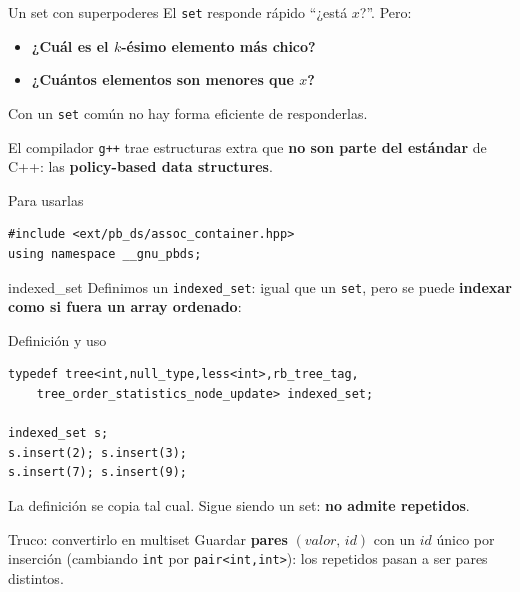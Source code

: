 \documentclass{beamer}
\begin{document}
\begin{frame}[fragile]{Un set con superpoderes}
    El \texttt{set} responde rápido ``¿está $x$?''. Pero:
    \begin{itemize}
        \item \textbf{¿Cuál es el $k$-ésimo elemento más chico?}
        \item \textbf{¿Cuántos elementos son menores que $x$?}
    \end{itemize}
    Con un \texttt{set} común no hay forma eficiente de responderlas.

    \vspace{0.2cm}
    El compilador \texttt{g++} trae estructuras extra que \textbf{no son parte
    del estándar} de C++: las \textbf{policy-based data structures}.
    \begin{block}{Para usarlas}
\begin{verbatim}
#include <ext/pb_ds/assoc_container.hpp>
using namespace __gnu_pbds;
\end{verbatim}
    \end{block}
\end{frame}


\begin{frame}[fragile]{indexed\_set}
    Definimos un \texttt{indexed\_set}: igual que un \texttt{set}, pero se
    puede \textbf{indexar como si fuera un array ordenado}:
    \begin{block}{Definición y uso}
    \footnotesize
\begin{verbatim}
typedef tree<int,null_type,less<int>,rb_tree_tag,
    tree_order_statistics_node_update> indexed_set;

indexed_set s;
s.insert(2); s.insert(3);
s.insert(7); s.insert(9);
\end{verbatim}
    \end{block}

    \vspace{0.1cm}
    La definición se copia tal cual. Sigue siendo un set:
    \textbf{no admite repetidos}.

    \begin{exampleblock}{Truco: convertirlo en multiset}
        Guardar \textbf{pares} $(valor,\, id)$ con un $id$ único por inserción
        (cambiando \texttt{int} por \texttt{pair<int,int>}): los repetidos
        pasan a ser pares distintos.
    \end{exampleblock}
\end{frame}
\end{document}
